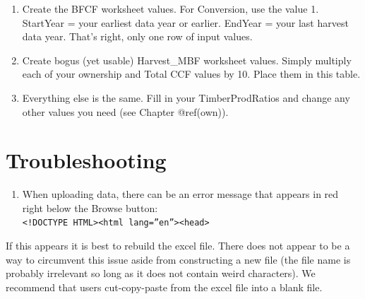 \documentclass[
  openany]{book}
\providecommand{\tightlist}{%
  \setlength{\itemsep}{0pt}\setlength{\parskip}{0pt}}
\begin{document}
\begin{enumerate}
\def\labelenumi{\arabic{enumi}.}
\tightlist
\item
  Create the BFCF worksheet values. For Conversion, use the value 1.
  StartYear = your earliest data year or earlier. EndYear = your last
  harvest data year. That's right, only one row of input values.\\
\item
  Create bogus (yet usable) Harvest\_MBF worksheet values. Simply
  multiply each of your ownership and Total CCF values by 10. Place them
  in this table.\\
\item
  Everything else is the same. Fill in your TimberProdRatios and change
  any other values you need (see Chapter @ref(own)).
\end{enumerate}

\hypertarget{ft-trbl}{%
\section{Troubleshooting}\label{ft-trbl}}

\begin{enumerate}
\def\labelenumi{\arabic{enumi}.}
\tightlist
\item
  When uploading data, there can be an error message that appears in red
  right below the Browse button:\\
  \texttt{\textless{}!DOCTYPE\ HTML\textgreater{}\textless{}html\ lang=”en”\textgreater{}\textless{}head\textgreater{}}
\end{enumerate}

If this appears it is best to rebuild the excel file. There does not
appear to be a way to circumvent this issue aside from constructing a
new file (the file name is probably irrelevant so long as it does not
contain weird characters). We recommend that users cut-copy-paste from
the excel file into a blank file.
\end{document}
